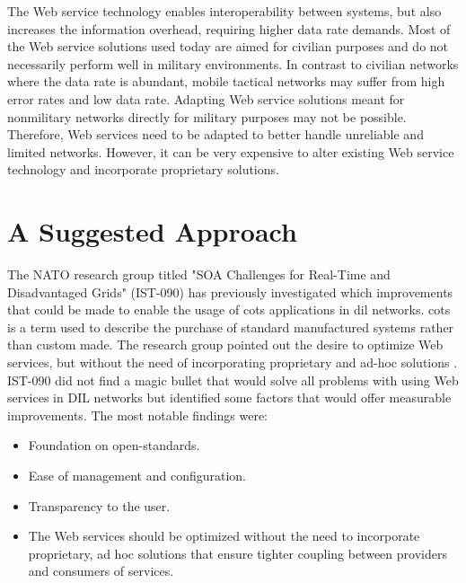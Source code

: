 The Web service technology enables interoperability between systems, but also
increases the information overhead, requiring higher data rate demands. Most of
the Web service solutions used today are aimed for civilian purposes and do not
necessarily perform well in military environments. In contrast to civilian
networks where the data rate is abundant, mobile tactical networks may suffer
from high error rates and low data rate. Adapting Web service solutions meant
for nonmilitary networks directly for military purposes may not be possible.
Therefore, Web services need to be adapted to better handle unreliable and
limited networks. However, it can be very expensive to alter existing Web
service technology and incorporate proprietary solutions.



\section{A Suggested Approach}
\label{section:hypothesis}

The NATO research group titled "SOA Challenges for Real-Time and Disadvantaged
Grids" (IST-090) has previously investigated which improvements that could be
made to enable the usage of \gls{cots} applications in \gls{dil} networks.
\Gls{cots} is a term used to describe the purchase of standard manufactured
systems rather than custom made. The research group pointed out the desire to
optimize Web services, but without the need of incorporating proprietary and
ad-hoc solutions \cite{ist-090}. IST-090 did not find a magic bullet that would
solve all problems with using Web services in DIL networks but identified some
factors that would offer measurable improvements. The most notable findings
were:

\begin{itemize}

    \item Foundation on open-standards.

    \item Ease of management and configuration.

    \item Transparency to the user.

    \item The Web services should be optimized without the need to incorporate
    proprietary, ad hoc solutions that ensure tighter coupling between providers
    and consumers of services.

\end{itemize}

